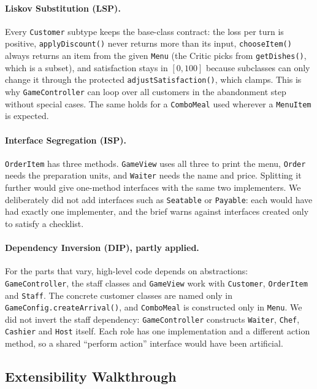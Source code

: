 \paragraph{Liskov Substitution (LSP).}
Every \texttt{Customer} subtype keeps the base-class contract: the loss per turn is positive, \texttt{applyDiscount()} never returns more than its input, \texttt{chooseItem()} always returns an item from the given \texttt{Menu} (the Critic picks from \texttt{getDishes()}, which is a subset), and satisfaction stays in $[0,100]$ because subclasses can only change it through the protected \texttt{adjustSatisfaction()}, which clamps. This is why \texttt{GameController} can loop over all customers in the abandonment step without special cases. The same holds for a \texttt{ComboMeal} used wherever a \texttt{MenuItem} is expected.

\paragraph{Interface Segregation (ISP).}
\texttt{OrderItem} has three methods. \texttt{GameView} uses all three to print the menu, \texttt{Order} needs the preparation units, and \texttt{Waiter} needs the name and price. Splitting it further would give one-method interfaces with the same two implementers. We deliberately did not add interfaces such as \texttt{Seatable} or \texttt{Payable}: each would have had exactly one implementer, and the brief warns against interfaces created only to satisfy a checklist.

\paragraph{Dependency Inversion (DIP), partly applied.}
For the parts that vary, high-level code depends on abstractions: \texttt{GameController}, the staff classes and \texttt{GameView} work with \texttt{Customer}, \texttt{OrderItem} and \texttt{Staff}. The concrete customer classes are named only in \texttt{GameConfig.createArrival()}, and \texttt{ComboMeal} is constructed only in \texttt{Menu}. We did not invert the staff dependency: \texttt{GameController} constructs \texttt{Waiter}, \texttt{Chef}, \texttt{Cashier} and \texttt{Host} itself. Each role has one implementation and a different action method, so a shared ``perform action'' interface would have been artificial.

\subsection{Extensibility Walkthrough}

